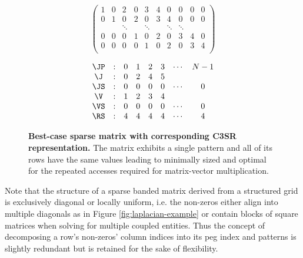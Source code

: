     \begin{figure}[ht]
      \centering
      \begin{minipage}{0.5\textwidth}
        \centering
        $$
        \begin{pmatrix}
          1 & 0 & 2 & 0 & 3 & 4 & 0 & 0 & 0 & 0 \\
          0 & 1 & 0 & 2 & 0 & 3 & 4 & 0 & 0 & 0 \\
            &   & \ddots &   & \ddots &   & \ddots & \ddots \\
          0 & 0 & 0 & 1 & 0 & 2 & 0 & 3 & 4 & 0 \\
          0 & 0 & 0 & 0 & 1 & 0 & 2 & 0 & 3 & 4 \\
        \end{pmatrix}
        $$
      \end{minipage}
      \begin{minipage}{0.4\textwidth}
        \centering
        $$
        \begin{matrix}
          \JP & : & 0 & 1 & 2 & 3 & \cdots & N-1 \\
           \J & : & 0 & 2 & 4 & 5 &        &     \\
          \JS & : & 0 & 0 & 0 & 0 & \cdots &  0  \\
           \V & : & 1 & 2 & 3 & 4 &        &     \\
          \VS & : & 0 & 0 & 0 & 0 & \cdots &  0  \\
          \RS & : & 4 & 4 & 4 & 4 & \cdots &  4  \\
        \end{matrix}
        $$
      \end{minipage}
      \caption[Best-case sparse matrix with corresponding C3SR representation.]{\textbf{Best-case sparse matrix with corresponding C3SR representation.} The matrix exhibits a single pattern and all of its rows have the same values leading to minimally sized \J and \V optimal for the repeated accesses required for matrix-vector multiplication.}
      \label{fig:c3sr-example-best-case}
    \end{figure}

    Note that the structure of a sparse banded matrix derived from a structured grid is exclusively diagonal or locally uniform, i.e. the non-zeros either align into multiple diagonals as in Figure \ref{fig:laplacian-example} or contain blocks of square matrices when solving for multiple coupled entities. Thus the concept of decomposing a row's non-zeros' column indices into its peg index and patterns is slightly redundant but is retained for the sake of flexibility.

